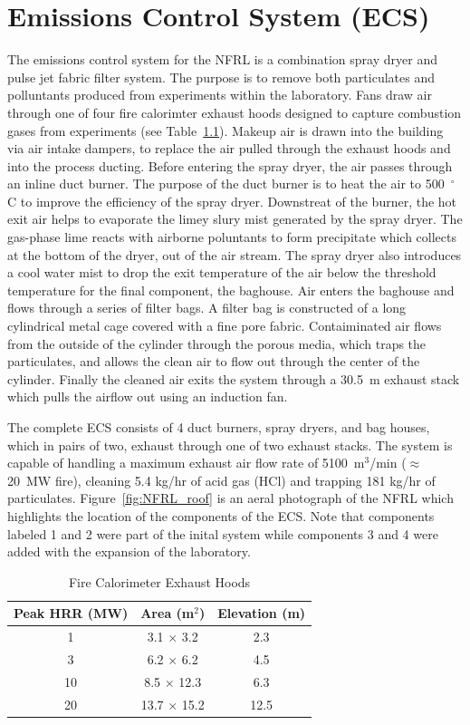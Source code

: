 \documentclass[12pt,oneside]{book}
\begin{document}
\chapter{Emissions Control System (ECS)}
\label{ecs}
The emissions control system for the NFRL is a combination spray dryer and pulse jet fabric filter system. The purpose is to remove both particulates and polluntants produced from experiments within the laboratory. Fans draw air through one of four fire calorimter exhaust hoods designed to capture combustion gases from experiments (see Table~\ref{tab:hoods}). Makeup air is drawn into the building via air intake dampers, to replace the air pulled through the exhaust hoods and into the process ducting. Before entering the spray dryer, the air passes through an inline duct burner. The purpose of the duct burner is to heat the air to 500~$^{\circ}$C to improve the efficiency of the spray dryer. Downstreat of the burner, the hot exit air helps to evaporate the limey slury mist generated by the spray dryer. The gas-phase lime reacts with airborne poluntants to form precipitate which collects at the bottom of the dryer, out of the air stream. The spray dryer also introduces a cool water mist to drop the exit temperature of the air below the threshold temperature for the final component, the baghouse. Air enters the baghouse and flows through a series of filter bags. A filter bag is constructed of a long cylindrical metal cage covered with a fine pore fabric. Contaiminated air flows from the outside of the cylinder through the porous media, which traps the particulates, and allows the clean air to flow out through the center of the cylinder. Finally the cleaned air exits the system through a 30.5~m exhaust stack which pulls the airflow out using an induction fan.

The complete ECS consists of 4 duct burners, spray dryers, and bag houses, which in pairs of two, exhaust through one of two exhaust stacks. The system is capable of handling a maximum exhaust air flow rate of 5100~m$^3$/min ($\approx$ 20~MW fire), cleaning 5.4 kg/hr of acid gas (HCl) and trapping 181 kg/hr of particulates. Figure~\ref{fig:NFRL_roof} is an aeral photograph of the NFRL which highlights the location of the components of the ECS. Note that components labeled 1 and 2 were part of the inital system while components 3 and 4 were added with the expansion of the laboratory. 

\begin{table}[!h]
\centering
\caption{Fire Calorimeter Exhaust Hoods}
\label{tab:hoods}
\begin{tabular}{ccc}
\toprule[1.5pt]
Peak HRR (MW) & Area (m$^2$) & Elevation (m)  \\
\midrule
1    & 3.1  $\times$ 3.2   & 2.3  \\
3    & 6.2  $\times$ 6.2   & 4.5  \\
10   & 8.5  $\times$ 12.3  & 6.3  \\
20   & 13.7 $\times$ 15.2  & 12.5 \\
\bottomrule[1.25pt]
\end{tabular}\par
\end{table}
\end{document}
